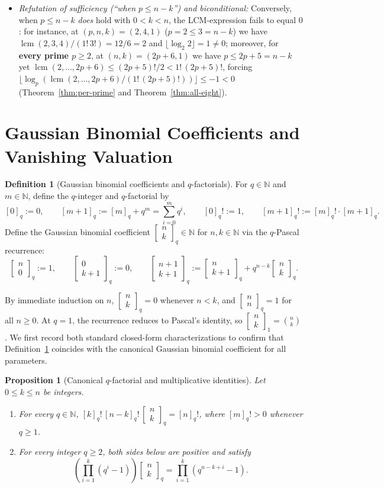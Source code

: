\documentclass[11pt,a4paper]{article}
\newtheorem{proposition}[theorem]{Proposition}
\theoremstyle{definition}
\newtheorem{definition}[theorem]{Definition}
\theoremstyle{remark}
\newcommand{\qbinom}[3]{\begin{bmatrix} #1 \\ #2 \end{bmatrix}_{#3}}
\newcommand{\lcm}{\operatorname{lcm}}
\begin{document}
\begin{enumerate}
\begin{itemize}
      \item \emph{Refutation of sufficiency (``when $p \le n - k$'') and biconditional:}
        Conversely, when $p \le n - k$ \emph{does} hold with $0 < k < n$, the
        LCM-expression fails to equal $0$: for instance, at $(p,n,k) = (2,4,1)$
        ($p = 2 \le 3 = n - k$) we have $\lcm(2,3,4)/(1!\,3!) = 12/6 = 2$ and
        $\lfloor \log_2 2 \rfloor = 1 \neq 0$; moreover, for \textbf{every prime
        $p \ge 2$}, at $(n,k) = (2p+6,1)$ we have $p \le 2p+5 = n-k$ yet
        $\lcm(2,\dots,2p+6) \le (2p+5)!/2 < 1!\,(2p+5)!$, forcing
        $\lfloor \log_p(\lcm(2,\dots,2p+6)/(1!\,(2p+5)!))\rfloor \le -1 < 0$
        (Theorem~\ref{thm:per-prime} and Theorem~\ref{thm:all-eight}).
    \end{itemize}
\end{enumerate}

\section{Gaussian Binomial Coefficients and Vanishing Valuation}

\begin{definition}[Gaussian binomial coefficients and $q$-factorials]
\label{def:qbinom}
For $q \in \mathbb{N}$ and $m \in \mathbb{N}$, define the $q$-integer and
$q$-factorial by
\[
  [0]_q := 0, \qquad [m+1]_q := [m]_q + q^m = \sum_{i=0}^{m} q^i,
  \qquad
  [0]_q! := 1, \qquad [m+1]_q! := [m]_q! \cdot [m+1]_q.
\]
Define the Gaussian binomial coefficient $\qbinom{n}{k}{q} \in \mathbb{N}$ for
$n, k \in \mathbb{N}$ via the $q$-Pascal recurrence:
\[
  \qbinom{n}{0}{q} := 1, \qquad
  \qbinom{0}{k+1}{q} := 0, \qquad
  \qbinom{n+1}{k+1}{q} := \qbinom{n}{k+1}{q} + q^{n-k} \qbinom{n}{k}{q}.
\]
\end{definition}

By immediate induction on $n$, $\qbinom{n}{k}{q} = 0$ whenever $n < k$, and
$\qbinom{n}{n}{q} = 1$ for all $n \ge 0$. At $q = 1$, the recurrence reduces to
Pascal's identity, so $\qbinom{n}{k}{1} = \binom{n}{k}$. We first record both
standard closed-form characterizations to confirm that Definition~\ref{def:qbinom}
coincides with the canonical Gaussian binomial coefficient for all parameters.

\begin{proposition}[Canonical $q$-factorial and multiplicative identities]
\label{prop:qbinom-canon}
Let $0 \le k \le n$ be integers.
\begin{enumerate}
  \item For every $q \in \mathbb{N}$,
    $[k]_q! \, [n-k]_q! \, \qbinom{n}{k}{q} = [n]_q!$, where $[m]_q! > 0$ whenever
    $q \ge 1$.
  \item For every integer $q \ge 2$, both sides below are positive and satisfy
    \[
      \left(\prod_{i=1}^{k} (q^i - 1)\right) \qbinom{n}{k}{q}
      = \prod_{i=1}^{k} (q^{n-k+i} - 1).
    \]
\end{enumerate}
\end{proposition}
\end{document}
